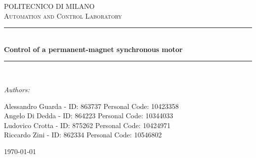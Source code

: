 \documentclass[12pt]{article}
\begin{document}
\begin{titlepage}

\newcommand{\HRule}{\rule{\linewidth}{0.5mm}} %

\center %
 

\textsc{\LARGE POLITECNICO DI MILANO}\\[1cm] %
\textsc{\Large Automation and Control Laboratory}\\[1cm] %


\HRule \\[0.4cm]
{ \huge \bfseries Control of a permanent-magnet synchronous motor}\\[0.4cm] %
\HRule \\[1.5cm]
 

\begin{flushleft}
\Large \emph{Authors:}\\[0.3cm]
\begin{large}
Alessandro Guarda - ID: 863737 Personal Code: 10423358\\
Angelo Di Dedda   - ID: 864223 Personal Code: 10344033\\
Ludovico Crotta   - ID: 875262 Personal Code: 10424971\\
Riccardo Zini     - ID: 862334 Personal Code: 10546802\\[1.5cm]\end{large}
\end{flushleft}


\begin{flushright}
{\large \today}\\[2.5cm]
\end{flushright}


\end{titlepage}
\end{document}

